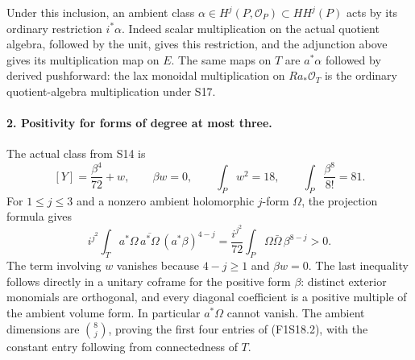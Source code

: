 Under this inclusion, an ambient class
$\alpha\in H^j(P,\mathcal O_P)\subset HH^j(P)$ acts by its
ordinary restriction $i^*\alpha$. Indeed scalar multiplication on
the actual quotient algebra, followed by the unit, gives this
restriction, and the adjunction above gives its multiplication map
on $E$. The same maps on $T$ are $a^*\alpha$ followed by derived
pushforward: the lax monoidal multiplication on $Ra_*\mathcal O_T$
is the ordinary quotient-algebra multiplication under S17.

\paragraph{2. Positivity for forms of degree at most three.}
The actual class from S14 is
\[
             [Y]=\frac{\beta^4}{72}+w,\qquad
          \beta w=0,\qquad \int_Pw^2=18,
          \qquad\int_P\frac{\beta^8}{8!}=81.
 \tag{F1S18.3}
\]
For $1\leq j\leq3$ and a nonzero ambient holomorphic $j$-form
$\Omega$, the projection formula gives
\[
 i^{j^2}\int_Ta^*\Omega\,\overline{a^*\Omega}\,(a^*\beta)^{4-j}
       =\frac{i^{j^2}}{72}
                       \int_P\Omega\bar\Omega\,\beta^{8-j}>0.
 \tag{F1S18.4}
\]
The term involving $w$ vanishes because $4-j\geq1$ and
$\beta w=0$. The last inequality follows directly in a unitary
coframe for the positive form $\beta$: distinct exterior monomials
are orthogonal, and every diagonal coefficient is a positive
multiple of the ambient volume form. In particular $a^*\Omega$
cannot vanish. The ambient dimensions are $\binom8j$, proving
the first four entries of (F1S18.2), with the constant entry
following from connectedness of $T$.

